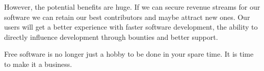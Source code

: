 However, the potential benefits are huge. If we can secure revenue streams for our software we can retain our best contributors and maybe attract new ones. Our users will get a better experience with faster software development, the ability to directly influence development through bounties and better support.

Free software is no longer just a hobby to be done in your spare time. It is time to make it a business.
